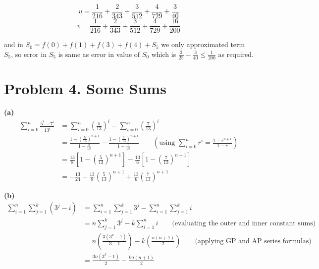 \documentclass{article}
\begin{document}
\[u = \frac{1}{216} + \frac{2}{343} + \frac{3}{512} + \frac{4}{729} + \frac{3}{40}\]
\[v = \frac{1}{216} + \frac{2}{343} + \frac{3}{512} + \frac{4}{729} + \frac{16}{200}\]

and in $S_0 = f(0)+f(1)+f(3)+f(4)+S_5$ we only approximated term $S_5$, so error in $S_5$ is same as error in value of $S_0$ which is
$\frac{2}{25} - \frac{3}{40} \leq \frac{1}{200}$ as required.

\section*{Problem 4. Some Sums}

\textbf{(a)}
\[
\begin{aligned} 
\sum_{i = 0}^{n}\frac{5^i - 7^i}{13^i} 
&= \sum_{i = 0}^{n} \left(\frac{5}{13}\right)^i - \sum_{i = 0}^{n} \left(\frac{7}{13}\right)^i \\ 
&= \frac{1 - \left(\frac{5}{13}\right)^{n+1}}{1 - \frac{5}{13}} - \frac{1 - \left(\frac{7}{13}\right)^{n+1}}{1 - \frac{7}{13}} \qquad \left( \text{using } \sum_{i=0}^{n} r^i = \frac{1-r^{n+1}}{1-r} \right) \\
&= \frac{13}{8} \left[ 1 - \left(\frac{5}{13}\right)^{n+1} \right] - \frac{13}{6} \left[ 1 - \left(\frac{7}{13}\right)^{n+1} \right] \\
&= -\frac{13}{24} - \frac{13}{8}\left(\frac{5}{13}\right)^{n+1} + \frac{13}{6}\left(\frac{7}{13}\right)^{n+1} 
\end{aligned}
\]

\vspace{\baselineskip}
\textbf{(b)}
\[
\begin{aligned}
\sum_{i=1}^{n} \sum_{j=1}^{k} (3^j - i) 
&= \sum_{i=1}^{n} \sum_{j=1}^{k} 3^j - \sum_{i=1}^{n} \sum_{j=1}^{k} i \\
&= n \sum_{j=1}^{k} 3^j - k \sum_{i=1}^{n} i \qquad \text{(evaluating the outer and inner constant sums)} \\
&= n \left( \frac{3(3^k - 1)}{3 - 1} \right) - k \left( \frac{n(n+1)}{2} \right) \qquad \text{(applying GP and AP series formulas)} \\
&= \frac{3n(3^k - 1)}{2} - \frac{kn(n+1)}{2}
\end{aligned}
\]
\end{document}
